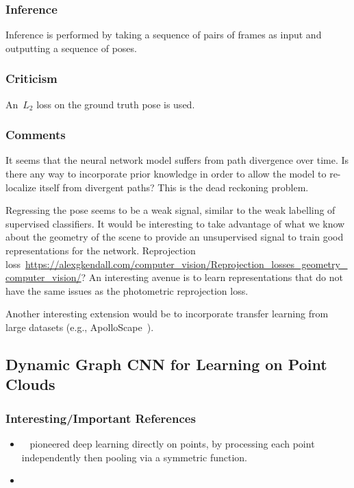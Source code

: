 \documentclass[a4paper, 12pt]{article}
\begin{document}
\subsubsection{Inference}

Inference is performed by taking a sequence of pairs of frames as input and
outputting a sequence of poses.


\subsubsection{Criticism}

An~$L_2$ loss on the ground truth pose is used.


\subsubsection{Comments}

It seems that the neural network model suffers from path divergence over time.
Is there any way to incorporate prior knowledge in order to allow the model to
re-localize itself from divergent paths? This is the dead reckoning problem.

Regressing the pose seems to be a weak signal, similar to the weak labelling of
supervised classifiers. It would be interesting to take advantage of what we
know about the geometry of the scene to provide an unsupervised signal to train
good representations for the network. Reprojection
loss~\url{https://alexgkendall.com/computer_vision/Reprojection_losses_geometry_computer_vision/}?
An interesting avenue is to learn representations that do not have the same
issues as the photometric reprojection loss.

Another interesting extension would be to incorporate transfer learning from
large datasets (e.g., ApolloScape~\citet{huang-apolloscape-2018}).


\subsection{Dynamic Graph CNN for Learning on Point
            Clouds~\cite{dgcnn2018wang}}


\subsubsection{Interesting/Important References}

\begin{itemize}
        \item~\cite{qi2016pointnet} pioneered deep learning directly on points,
                by processing each point independently then pooling via a
                symmetric function.

        \item~\cite{bruna2013dynamic}
\end{itemize}
\end{document}

